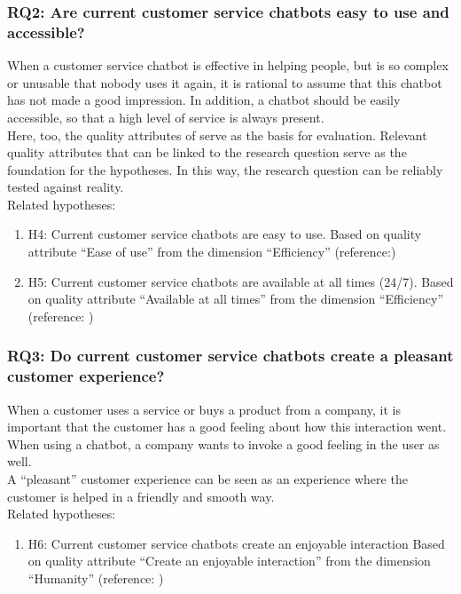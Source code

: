 \subsubsection{RQ2: Are current customer service chatbots easy to use and accessible?}
When a customer service chatbot is effective in helping people, but is so complex or unusable that nobody uses it again, it is rational to assume that this chatbot has not made a good impression. In addition, a chatbot should be easily accessible, so that a high level of service is always present.\\
Here, too, the quality attributes of \citep{Verkeyn2018} serve as the basis for evaluation. Relevant quality attributes that can be linked to the research question serve as the foundation for the hypotheses. In this way, the research question can be reliably tested against reality.\\
\break
\break
Related hypotheses:
\begin{enumerate}
	\item H4: Current customer service chatbots are easy to use. Based on \citep{Verkeyn2018} quality attribute “Ease of use” from the dimension “Efficiency” (reference:\citep*{Candela2018, Duijst2017})
	\item H5: Current customer service chatbots are available at all times (24/7). Based on \citep{Verkeyn2018} quality attribute “Available at all times” from the dimension “Efficiency” (reference: \citep{Wang2019})
\end{enumerate}

\subsubsection{RQ3: Do current customer service chatbots create a pleasant customer experience?}
When a customer uses a service or buys a product from a company, it is important that the customer has a good feeling about how this interaction went. When using a chatbot, a company wants to invoke a good feeling in the user as well. \\
\break
A “pleasant” customer experience can be seen as an experience where the customer is helped in a friendly and smooth way.\\
\break
\break
Related hypotheses:
\begin{enumerate}
	\item H6: Current customer service chatbots create an enjoyable interaction Based on \citep{Verkeyn2018} quality attribute “Create an enjoyable interaction” from the dimension “Humanity” (reference: \citep{Morrissey2013})
\end{enumerate}

